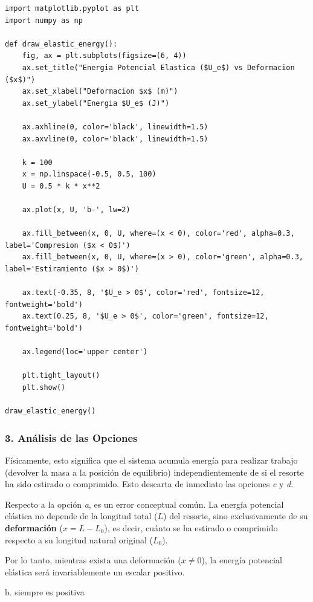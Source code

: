 \documentclass[12pt, a4paper]{article}
\begin{document}
\begin{lstlisting}
import matplotlib.pyplot as plt
import numpy as np

def draw_elastic_energy():
    fig, ax = plt.subplots(figsize=(6, 4))
    ax.set_title("Energia Potencial Elastica ($U_e$) vs Deformacion ($x$)")
    ax.set_xlabel("Deformacion $x$ (m)")
    ax.set_ylabel("Energia $U_e$ (J)")
    
    ax.axhline(0, color='black', linewidth=1.5)
    ax.axvline(0, color='black', linewidth=1.5)
    
    k = 100 
    x = np.linspace(-0.5, 0.5, 100)
    U = 0.5 * k * x**2
    
    ax.plot(x, U, 'b-', lw=2)
    
    ax.fill_between(x, 0, U, where=(x < 0), color='red', alpha=0.3, label='Compresion ($x < 0$)')
    ax.fill_between(x, 0, U, where=(x > 0), color='green', alpha=0.3, label='Estiramiento ($x > 0$)')
    
    ax.text(-0.35, 8, '$U_e > 0$', color='red', fontsize=12, fontweight='bold')
    ax.text(0.25, 8, '$U_e > 0$', color='green', fontsize=12, fontweight='bold')
    
    ax.legend(loc='upper center')
    
    plt.tight_layout()
    plt.show()

draw_elastic_energy()
\end{lstlisting}

\subsubsection*{3. Análisis de las Opciones}
Físicamente, esto significa que el sistema acumula energía para realizar trabajo (devolver la masa a la posición de equilibrio) independientemente de si el resorte ha sido estirado o comprimido. Esto descarta de inmediato las opciones \textit{c} y \textit{d}.

Respecto a la opción \textit{a}, es un error conceptual común. La energía potencial elástica no depende de la longitud total ($L$) del resorte, sino exclusivamente de su \textbf{deformación} ($x = L - L_0$), es decir, cuánto se ha estirado o comprimido respecto a su longitud natural original ($L_0$).

Por lo tanto, mientras exista una deformación ($x \neq 0$), la energía potencial elástica será invariablemente un escalar positivo.

\begin{tcolorbox}[colback=green!5!white, colframe=green!50!black, title=Respuesta Correcta]
\centering \Large b. siempre es positiva
\end{tcolorbox}
\end{document}
